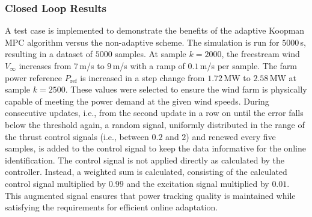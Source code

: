 \subsubsection{Closed Loop Results}
A test case is implemented to demonstrate the benefits of the adaptive Koopman MPC algorithm versus the non-adaptive scheme. The simulation is run for $5000$\,s, resulting in a dataset of $5000$ samples. At sample $k = 2000$, the freestream wind $V_\infty$ increases from $7$\,m/s to $9$\,m/s with a ramp of $0.1$\,m/s per sample. The farm power reference $P_{\text{ref}}$ is increased in a step change from $1.72$\,MW to $2.58$\,MW at sample $k = 2500$. These values were selected to ensure the wind farm is physically capable of meeting the power demand at the given wind speeds. During consecutive updates, i.e., from the second update in a row on until the error falls below the threshold again, a random signal, uniformly distributed in the range of the thrust control signals (i.e., between $0.2$ and $2$) and renewed every five samples, is added to the control signal to keep the data informative for the online identification. The control signal is not applied directly as calculated by the controller. Instead, a weighted sum is calculated, consisting of the calculated control signal multiplied by $0.99$ and the excitation signal multiplied by $0.01$. This augmented signal ensures that power tracking quality is maintained while satisfying the requirements for efficient online adaptation.

